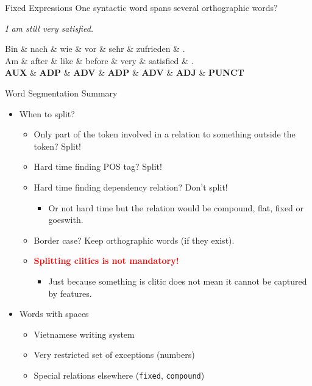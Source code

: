 \documentclass[10pt, compress, aspectratio=169]{beamer}
\renewcommand{\alert}[1]{\textcolor{red}{\textbf{#1}}}
\newcommand{\upos}[1]{\textbf{\color{blue}#1}}
\begin{document}
\begin{frame}{Fixed Expressions}
One syntactic word spans several orthographic words?

\textit{I am still very satisfied.}

\begin{dependency}[label style={thick, font=\bfseries}]
  \begin{deptext}[font=\bfseries]
  Bin \& nach \& wie \& vor \& sehr \& zufrieden \& . \\
  Am \& after \& like \& before \& very \& satisfied \& . \\
  \upos{AUX} \& \upos{ADP} \& \upos{ADV} \& \upos{ADP} \& \upos{ADV} \& \upos{ADJ} \& \upos{PUNCT} \\
  \end{deptext}
\end{dependency}
\end{frame}



\begin{frame}{Word Segmentation Summary}
\begin{itemize}
\item When to split?
  \begin{itemize}
  \item Only part of the token involved in a relation to something outside the token? Split!
  \item<2-> Hard time finding POS tag? Split!
  \item<3-> Hard time finding dependency relation? Don't split!
    \begin{itemize}
    \item Or not hard time but the relation would be compound, flat, fixed or goeswith.
    \end{itemize}
  \item<4-> Border case? Keep orthographic words (if they exist).
  \item<4-> \alert{Splitting clitics is not mandatory!}
    \begin{itemize}
    \item Just because something is clitic does not mean it cannot be
        captured by features.
    \end{itemize}
  \end{itemize}
\bigskip
\item<5-> Words with spaces
  \begin{itemize}
  \item Vietnamese writing system
  \item Very restricted set of exceptions (numbers)
  \item Special relations elsewhere (\texttt{fixed}, \texttt{compound})
  \end{itemize}
\end{itemize}
\end{frame}
\end{document}
